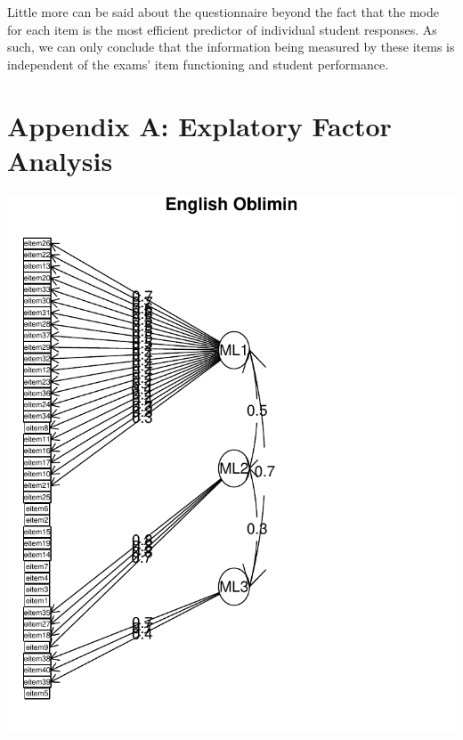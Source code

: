 \documentclass{article}\usepackage[]{graphicx}\usepackage[]{color}
\makeatletter
\def\maxwidth{ %
  \ifdim\Gin@nat@width>\linewidth
    \linewidth
  \else
    \Gin@nat@width
  \fi
}
\newenvironment{knitrout}{}{} %
\makeatother
\begin{document}
Little more can be said about the questionnaire beyond the fact that the mode for each item is the most efficient predictor of individual student responses. As such, we can only conclude that the information being measured by these items is independent of the exams' item functioning and student performance.


{}


\section{Appendix A: Explatory Factor Analysis}

\begin{knitrout}
\color{fgcolor}
\includegraphics[width=\maxwidth]{figure/unnamed-chunk-141} 


\end{knitrout}
\end{document}
